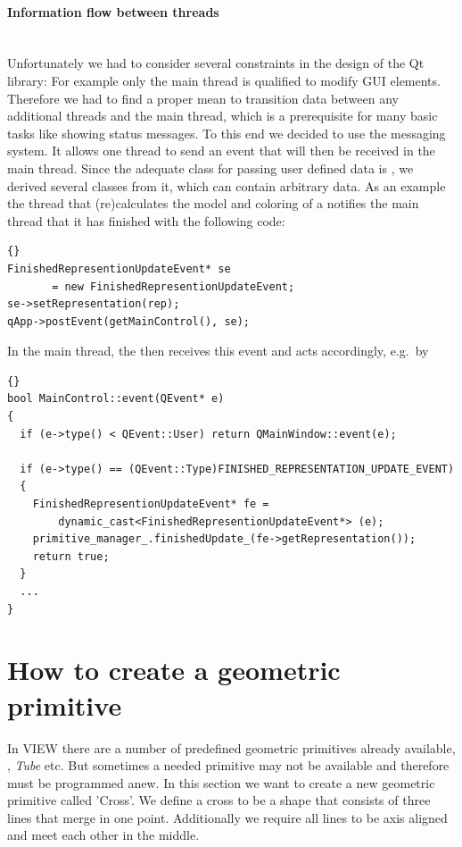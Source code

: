 \paragraph{Information flow between threads}
\hspace*{\fill}\\
Unfortunately we had to consider several constraints in the design of the Qt library: For example only the main thread 
is qualified to modify GUI elements. Therefore we had to find a proper mean to transition data between any additional 
threads and the main thread, which is a prerequisite for many basic tasks like showing status messages.
To this end we decided to use the  messaging system. It allows one thread to send an event that will
then be received in the main thread. Since the adequate class for passing user defined data
is , we derived several classes from it, which can contain arbitrary data.
As an example the thread that (re)calculates the model and coloring of a  notifies the main thread
that it has finished with the following code:
\begin{lstlisting}{}
FinishedRepresentionUpdateEvent* se 
       = new FinishedRepresentionUpdateEvent;
se->setRepresentation(rep);
qApp->postEvent(getMainControl(), se);
\end{lstlisting}
In the main thread, the  then receives this event and acts accordingly, e.g.\ by
\begin{lstlisting}{}
bool MainControl::event(QEvent* e)
{
  if (e->type() < QEvent::User) return QMainWindow::event(e);

  if (e->type() == (QEvent::Type)FINISHED_REPRESENTATION_UPDATE_EVENT)
  {
    FinishedRepresentionUpdateEvent* fe = 
        dynamic_cast<FinishedRepresentionUpdateEvent*> (e);
    primitive_manager_.finishedUpdate_(fe->getRepresentation());
    return true;
  }
  ...
}
\end{lstlisting}

\section{How to create a geometric primitive}
\label{section:view_create_a_geometric_primitive}

In VIEW there are a number of
predefined geometric primitives already available, , {\em
Tube} etc. But sometimes a needed primitive may not be available and
therefore must be programmed anew. 
In this section we want to create a new geometric primitive called 'Cross'.
We define a cross to be a shape that consists of three lines that merge in one
point. Additionally we require all lines to be axis aligned and meet each
other in the middle.

